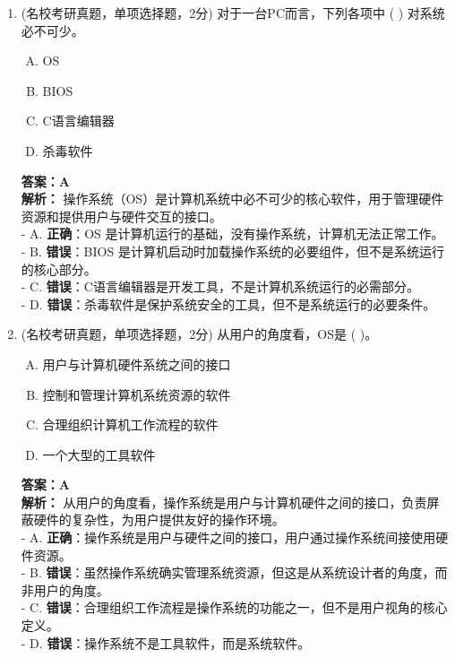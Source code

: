 \documentclass[lang=cn,newtx,10pt,scheme=chinese]{../../elegantbook}
\begin{document}
\begin{enumerate}
    \item (名校考研真题，单项选择题，2分) 对于一台PC而言，下列各项中 (    ) 对系统必不可少。
    \begin{enumerate}[A.]
        \item OS
        \item BIOS
        \item C语言编辑器
        \item 杀毒软件
    \end{enumerate}
    \textbf{答案：A}\\
    \textbf{解析：} 操作系统（OS）是计算机系统中必不可少的核心软件，用于管理硬件资源和提供用户与硬件交互的接口。\\
    - A. \textbf{正确}：OS 是计算机运行的基础，没有操作系统，计算机无法正常工作。\\
    - B. \textbf{错误}：BIOS 是计算机启动时加载操作系统的必要组件，但不是系统运行的核心部分。\\
    - C. \textbf{错误}：C语言编辑器是开发工具，不是计算机系统运行的必需部分。\\
    - D. \textbf{错误}：杀毒软件是保护系统安全的工具，但不是系统运行的必要条件。\\

\item (名校考研真题，单项选择题，2分) 从用户的角度看，OS是 (   )。
    \begin{enumerate}[A.]
        \item 用户与计算机硬件系统之间的接口
        \item 控制和管理计算机系统资源的软件
        \item 合理组织计算机工作流程的软件
        \item 一个大型的工具软件
    \end{enumerate}
    \textbf{答案：A}\\
    \textbf{解析：} 从用户的角度看，操作系统是用户与计算机硬件之间的接口，负责屏蔽硬件的复杂性，为用户提供友好的操作环境。\\
    - A. \textbf{正确}：操作系统是用户与硬件之间的接口，用户通过操作系统间接使用硬件资源。\\
    - B. \textbf{错误}：虽然操作系统确实管理系统资源，但这是从系统设计者的角度，而非用户的角度。\\
    - C. \textbf{错误}：合理组织工作流程是操作系统的功能之一，但不是用户视角的核心定义。\\
    - D. \textbf{错误}：操作系统不是工具软件，而是系统软件。\\


\end{enumerate}
\end{document}
